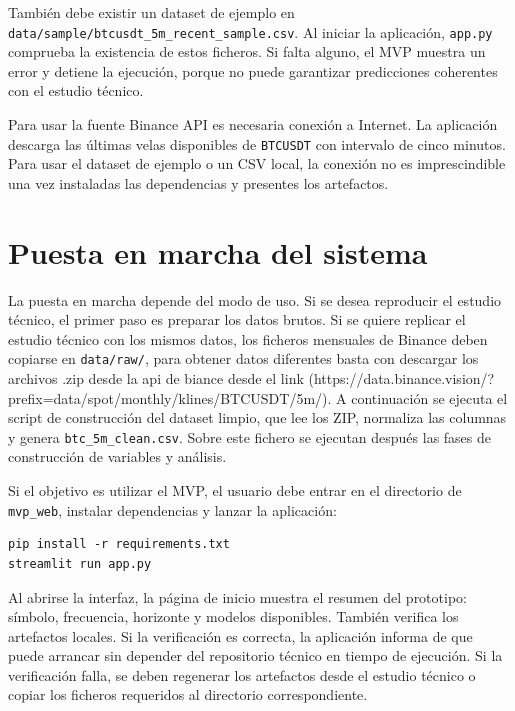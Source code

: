 También debe existir un dataset de ejemplo en \texttt{data/\allowbreak sample/\allowbreak btcusdt\_\allowbreak 5m\_\allowbreak recent\_\allowbreak sample.csv}. Al iniciar la aplicación, \texttt{app.py} comprueba la existencia de estos ficheros. Si falta alguno, el MVP muestra un error y detiene la ejecución, porque no puede garantizar predicciones coherentes con el estudio técnico.

Para usar la fuente Binance API es necesaria conexión a Internet. La aplicación descarga las últimas velas disponibles de \texttt{BTCUSDT} con intervalo de cinco minutos. Para usar el dataset de ejemplo o un CSV local, la conexión no es imprescindible una vez instaladas las dependencias y presentes los artefactos.

\section{Puesta en marcha del sistema}\label{sec:puesta-en-marcha}

La puesta en marcha depende del modo de uso. Si se desea reproducir el estudio técnico, el primer paso es preparar los datos brutos. Si se quiere replicar el estudio técnico con los mismos datos, los ficheros mensuales de Binance deben copiarse en \texttt{data/\allowbreak raw/}, para obtener datos diferentes basta con descargar los archivos .zip desde la api de biance desde el link (https://data.binance.vision/?prefix=data/spot/monthly/klines/BTCUSDT/5m/). A continuación se ejecuta el script de construcción del dataset limpio, que lee los ZIP, normaliza las columnas y genera \texttt{btc\_\allowbreak 5m\_\allowbreak clean.csv}. Sobre este fichero se ejecutan después las fases de construcción de variables y análisis.

Si el objetivo es utilizar el MVP, el usuario debe entrar en el directorio de \texttt{mvp\_\allowbreak web}, instalar dependencias y lanzar la aplicación:

\begin{verbatim}
pip install -r requirements.txt
streamlit run app.py
\end{verbatim}

Al abrirse la interfaz, la página de inicio muestra el resumen del prototipo: símbolo, frecuencia, horizonte y modelos disponibles. También verifica los artefactos locales. Si la verificación es correcta, la aplicación informa de que puede arrancar sin depender del repositorio técnico en tiempo de ejecución. Si la verificación falla, se deben regenerar los artefactos desde el estudio técnico o copiar los ficheros requeridos al directorio correspondiente.

